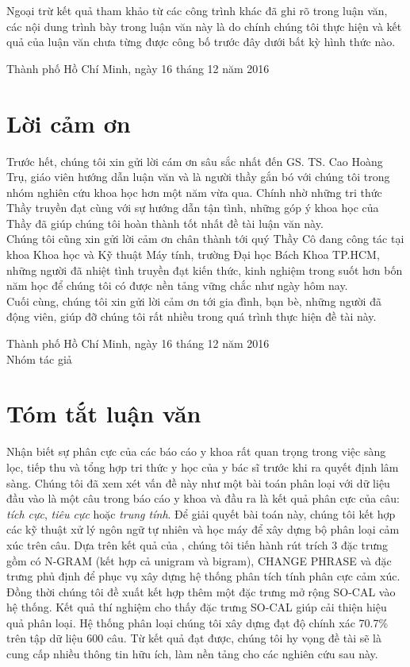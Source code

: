 \documentclass[a4paper, 12pt]{article}
\theoremstyle{definition}
\newcommand{\tichcuc}{\textit{tích cực}\xspace}
\newcommand{\tieucuc}{\textit{tiêu cực}\xspace}
\newcommand{\trungtinh}{\textit{trung tính}\xspace}
\begin{document}
Ngoại trừ kết quả tham khảo từ các công trình khác đã ghi rõ trong luận văn, các nội dung trình bày trong luận văn này là do chính chúng tôi thực hiện và kết quả của luận văn chưa từng được công bố trước đây dưới bất kỳ hình thức nào.\\

\begin{flushright}
Thành phố Hồ Chí Minh, ngày 16 tháng 12 năm 2016
\end{flushright}

\pagebreak
\section*{Lời cảm ơn}
Trước hết, chúng tôi xin gửi lời cám ơn sâu sắc nhất đến GS. TS. Cao Hoàng Trụ, giáo viên hướng dẫn luận văn và là người thầy gắn bó với chúng tôi trong nhóm nghiên cứu khoa học hơn một năm vừa qua. Chính nhờ những tri thức Thầy truyền đạt cùng với sự hướng dẫn tận tình, những góp ý khoa học của Thầy đã giúp chúng tôi hoàn thành tốt nhất đề tài luận văn này.\\

Chúng tôi cũng xin gửi lời cảm ơn chân thành tới quý Thầy Cô đang công tác tại khoa Khoa học và Kỹ thuật Máy tính, trường Đại học Bách Khoa TP.HCM, những người đã nhiệt tình truyền đạt kiến thức, kinh nghiệm trong suốt hơn bốn năm học để chúng tôi có được nền tảng vững chắc như ngày hôm nay.\\

Cuối cùng, chúng tôi xin gửi lời cảm ơn tới gia đình, bạn bè, những người đã động viên, giúp đỡ chúng tôi rất nhiều trong quá trình thực hiện đề tài này.\\

\begin{flushright}
Thành phố Hồ Chí Minh, ngày 16 tháng 12 năm 2016\\

Nhóm tác giả
\end{flushright}
\pagebreak
\section*{Tóm tắt luận văn}
Nhận biết sự phân cực của các báo cáo y khoa rất quan trọng trong việc sàng lọc, tiếp thu và tổng hợp tri thức y học của y bác sĩ trước khi ra quyết định lâm sàng. Chúng tôi đã xem xét vấn đề này như một bài toán phân loại với dữ liệu đầu vào là một câu trong báo cáo y khoa và đầu ra là kết quả phân cực của câu: \tichcuc, \tieucuc hoặc \trungtinh. Để giải quyết bài toán này, chúng tôi kết hợp các kỹ thuật xử lý ngôn ngữ tự nhiên và học máy để xây dựng bộ phân loại cảm xúc trên câu. Dựa trên kết quả của \cite{niu2005analysis}, chúng tôi tiến hành rút trích 3 đặc trưng gồm có N-GRAM (kết hợp cả unigram và bigram), CHANGE PHRASE và đặc trưng phủ định để phục vụ xây dựng hệ thống phân tích tính phân cực cảm xúc. Đồng thời chúng tôi đề xuất kết hợp thêm một đặc trưng mở rộng SO-CAL vào hệ thống. Kết quả thí nghiệm cho thấy đặc trưng SO-CAL giúp cải thiện hiệu quả phân loại. Hệ thống phân loại chúng tôi xây dựng đạt độ chính xác 70.7\% trên tập dữ liệu 600 câu. Từ kết quả đạt được, chúng tôi hy vọng đề tài sẽ là cung cấp nhiều thông tin hữu ích, làm nền tảng cho các nghiên cứu sau này.
\end{document}
